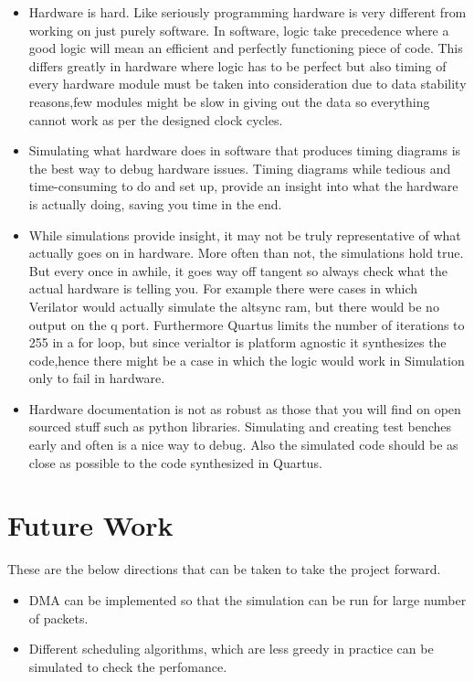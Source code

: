 \documentclass[twoside,12pt,fleqn]{book} %
\begin{document}
\begin{itemize}
    \item Hardware is hard. Like seriously programming hardware is very different from working on just purely software. In software, logic take precedence where a good logic will mean an efficient and perfectly functioning piece of code. This differs greatly in hardware where logic has to be perfect but also timing of every hardware module must be taken into consideration due to data stability reasons,few modules might be slow in giving out the data so everything cannot work as per the designed clock cycles.
    \item Simulating what hardware does in software that produces timing diagrams is the best way to debug hardware issues. Timing diagrams while tedious and time-consuming to do and set up, provide an insight into what the hardware is actually doing, saving you time in the end.
    \item While simulations provide insight, it may not be truly representative of what actually goes on in hardware. More often than not, the simulations hold true. But every once in awhile, it goes way off tangent so always check what the actual hardware is telling you. For example there were cases in which Verilator would actually simulate the altsync ram, but there would be no output on the q port. Furthermore Quartus limits the number of iterations to 255 in a for loop, but since verialtor is platform agnostic it synthesizes the code,hence there might be a case in which the logic would work in Simulation only to fail in hardware.
    \item Hardware documentation is not as robust as those that you will find on open sourced stuff such as python libraries. Simulating and creating test benches early and often is a nice way to debug. Also the simulated code should be as close as possible to the code synthesized in Quartus.
\end{itemize}

\section{Future Work}
These are the below directions that can be taken to take the project forward.
\begin{itemize}
    \item DMA can be implemented so that the simulation can be run for large number of packets.
    
    \item Different scheduling algorithms, which are less greedy in practice can be simulated to check the perfomance.
\end{itemize}
\end{document}
